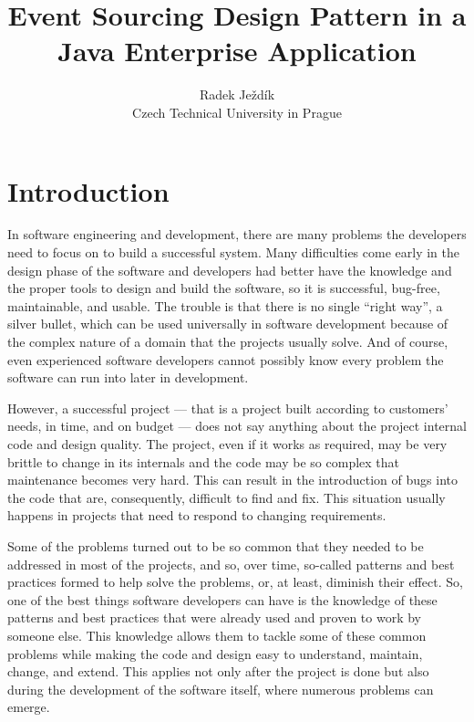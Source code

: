 \documentclass{book}
\begin{document}
\author{Radek Ježdík\\ Czech Technical University in Prague }


\title{Event Sourcing Design Pattern in a Java Enterprise Application}

 

\maketitle
 
\frontmatter 
\tableofcontents 
\newpage




\section{Introduction}\label{introduction}

In software engineering and development, there are many problems the
developers need to focus on to build a successful system. Many
difficulties come early in the design phase of the software and
developers had better have the knowledge and the proper tools to design
and build the software, so it is successful, bug-free, maintainable, and
usable. The trouble is that there is no single ``right way'', a silver
bullet, which can be used universally in software development because of
the complex nature of a domain that the projects usually solve. And of
course, even experienced software developers cannot possibly know every
problem the software can run into later in development.

However, a successful project --- that is a project built according to
customers' needs, in time, and on budget --- does not say anything about
the project internal code and design quality. The project, even if it
works as required, may be very brittle to change in its internals and
the code may be so complex that maintenance becomes very hard. This can
result in the introduction of bugs into the code that are, consequently,
difficult to find and fix. This situation usually happens in projects
that need to respond to changing requirements.

Some of the problems turned out to be so common that they needed to be
addressed in most of the projects, and so, over time, so-called patterns
and best practices formed to help solve the problems, or, at least,
diminish their effect. So, one of the best things software developers
can have is the knowledge of these patterns and best practices that were
already used and proven to work by someone else. This knowledge allows
them to tackle some of these common problems while making the code and
design easy to understand, maintain, change, and extend. This applies
not only after the project is done but also during the development of
the software itself, where numerous problems can emerge.
\end{document}
